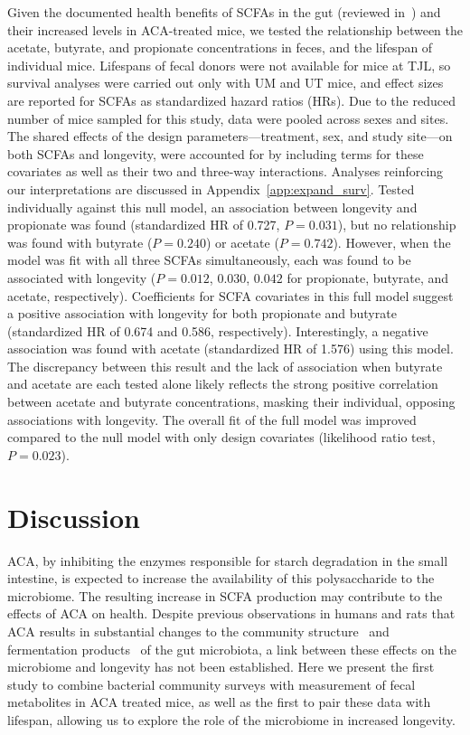 \documentclass{doc/template/bmcart-nofigbox}
\begin{document}
Given the documented health benefits of SCFAs in the gut (reviewed in~\cite{Koh2016})
and their increased levels in ACA-treated mice, we tested the relationship
between the acetate, butyrate, and propionate concentrations in feces,
and the lifespan of individual mice.
Lifespans of fecal donors were not available for mice at TJL,
so survival analyses were carried out only with UM and UT mice,
and effect sizes are reported for SCFAs as standardized hazard
ratios (HRs).
Due to the reduced number of mice sampled for this study, data were pooled
across sexes and sites.
The shared effects of the
design parameters---treatment, sex, and study site---on both SCFAs
and longevity, were accounted for by including terms for these covariates as
well as their two and three-way interactions.
Analyses reinforcing our interpretations are discussed in Appendix~\ref{app:expand_surv}.
Tested individually against this null model, an association between longevity
and propionate was found (standardized HR of 0.727, $P = 0.031$), but no
relationship was found with butyrate ($P = 0.240$) or acetate ($P = 0.742$).
However, when the model was fit with all three SCFAs simultaneously,
each was found to be associated with longevity
($P = 0.012$, $0.030$, $0.042$ for propionate, butyrate, and acetate, respectively).
Coefficients for SCFA covariates in this full model suggest a positive
association with longevity for both propionate and butyrate
(standardized HR of 0.674 and 0.586, respectively).
Interestingly, a negative association was found with
acetate (standardized HR of 1.576) using this model.
The discrepancy between this result and the lack of association when butyrate
and acetate are each tested alone likely reflects the strong positive
correlation between acetate and butyrate concentrations, masking their
individual, opposing associations with longevity.
The overall fit of the full model was improved
compared to the null model with only design covariates
(likelihood ratio test, $P = 0.023$).

\section*{Discussion}

ACA, by inhibiting the enzymes responsible for starch degradation in the small
intestine, is expected to increase the availability of this polysaccharide to
the microbiome.
The resulting increase in SCFA production may contribute to the effects of ACA
on health.
Despite previous observations in humans and rats that ACA results in
substantial changes to the community structure~\cite{Zhang2017, Weaver1997} and
fermentation products~\cite{Dehghan-Kooshkghazi2004, Weaver1997, Weaver2000, Wolin1999} of the gut
microbiota, a link between these effects on the microbiome and longevity has
not been established.
Here we present the first study to combine
bacterial community surveys with measurement of fecal metabolites in ACA
treated mice, as well as the first to pair these data with lifespan,
allowing us to explore the role of the microbiome in increased longevity.
\end{document}
